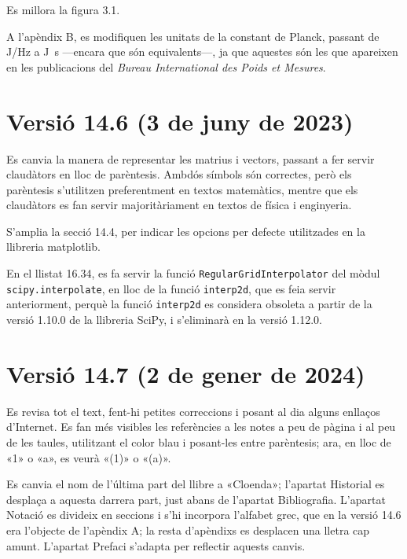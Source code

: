 Es millora la figura 3.1.

A l'apèndix B, es modifiquen les unitats de la constant de Planck, passant de \unit{J/Hz} a \unit{J.s} ---encara que són equivalents---, ja que aquestes són les que apareixen en les publicacions  del \textit{Bureau 	International des Poids et Mesures}.


\section*{Versió 14.6 (3 de juny de 2023)}

Es canvia la manera de representar les matrius i vectors, passant a fer servir claudàtors en lloc de parèntesis. Ambdós símbols són correctes, però els parèntesis s'utilitzen preferentment en textos matemàtics, mentre que els claudàtors es fan servir majoritàriament en textos de física i enginyeria.

S'amplia la secció 14.4, per indicar les opcions per defecte utilitzades en la llibreria matplotlib.

En el llistat 16.34, es fa servir la funció \texttt{RegularGridInterpolator} del mòdul \texttt{scipy.interpolate}, en lloc de la funció \texttt{interp2d}, que es feia servir anteriorment, perquè la funció \texttt{interp2d} es considera obsoleta a partir de la versió 1.10.0 de la llibreria SciPy, i s'eliminarà en la versió 1.12.0.


\section*{Versió 14.7 (2 de gener de 2024)}

Es revisa tot el text, fent-hi petites correccions i posant al dia alguns enllaços d'Internet. Es fan més visibles les referències a les notes a peu de pàgina i al peu de les taules, utilitzant el color blau i posant-les entre parèntesis; ara, en lloc de {\footnotesize«1»} o {\footnotesize«a»}, es veurà {\footnotesize\color{blue}«(1)»} o {\footnotesize\color{blue}«(a)»}.

Es canvia el nom de l'última part del llibre a «Cloenda»; l'apartat Historial es desplaça a aquesta darrera part, just abans de l'apartat Bibliografia. L'apartat Notació es divideix en seccions i s'hi incorpora l'alfabet grec, que en la versió 14.6 era l'objecte de l'apèndix A; la resta d'apèndixs es desplacen una lletra cap amunt. L'apartat Prefaci s'adapta per reflectir aquests canvis.

